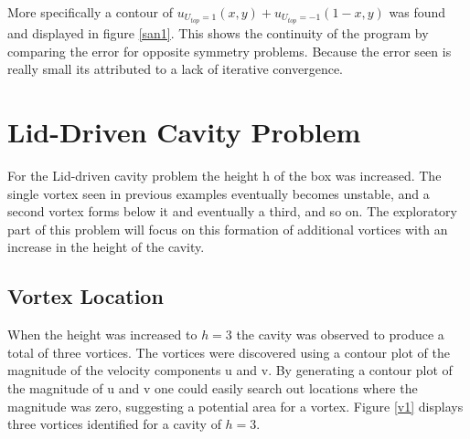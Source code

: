 \documentclass[paper=a4, fontsize=11pt, abstract=on]{scrartcl}
\numberwithin{equation}{section}		%
\numberwithin{figure}{section}			%
\numberwithin{table}{section}				%
\begin{document}
More specifically a contour of $u_{U_{top} = 1}(x,y) + u_{U_{top} = -1}(1-x,y)$ was found and displayed in figure \ref{san1}. This shows the continuity of the program by comparing the error for opposite symmetry problems. Because the error seen is really small its attributed to a lack of iterative convergence.




\section{Lid-Driven Cavity Problem}
For the Lid-driven cavity problem the height h of the box was increased. The single vortex seen in previous examples eventually becomes unstable, and a second vortex forms below it and eventually a third, and so on. The exploratory part of this problem will focus on this formation of additional vortices with an increase in the height of the cavity. 

\subsection{Vortex Location}
When the height was increased to $h=3$ the cavity was observed to produce a total of three vortices. The vortices were discovered using a contour plot of the magnitude of the velocity components u and v. By generating a contour plot of the magnitude of u and v one could easily search out locations where the magnitude was zero, suggesting a potential area for a vortex. Figure \ref{v1} displays three vortices identified for a cavity of $h=3$.
\end{document}
